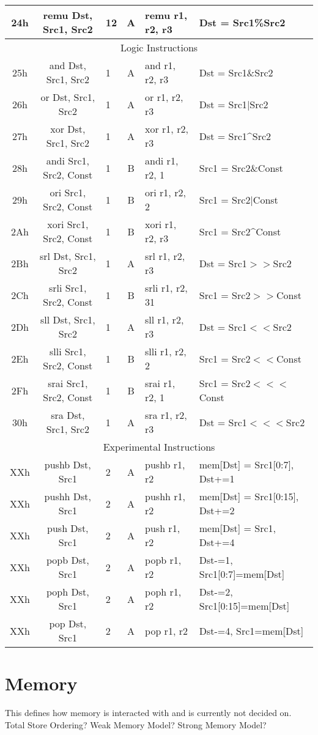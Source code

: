 \documentclass[]{article}
\begin{document}
\begin{longtable}{|c|c|l|c|l|p{5cm}|}
	\hline
	24h & remu Dst, Src1, Src2 & 12 & A & remu r1, r2, r3 & Dst = Src1\%Src2 \\
	\hline
	\multicolumn{6}{|c|}{Logic Instructions} \\
	\hline
	25h & and Dst, Src1, Src2 & 1 & A & and r1, r2, r3 & Dst = Src1\&Src2 \\
	\hline
	26h & or Dst, Src1, Src2 & 1 & A & or r1, r2, r3 & Dst = Src1$|$Src2 \\
	\hline
	27h & xor Dst, Src1, Src2 & 1 & A & xor r1, r2, r3 & Dst = Src1\string^Src2 \\
	\hline
	28h & andi Src1, Src2, Const & 1 & B & andi r1, r2, 1 & Src1 = Src2\&Const \\
	\hline
	29h & ori Src1, Src2, Const & 1 & B & ori r1, r2, 2 & Src1 = Src2$|$Const \\
	\hline
	2Ah & xori Src1, Src2, Const & 1 & B & xori r1, r2, r3 & Src1 = Src2\string^Const \\
	\hline
	2Bh & srl Dst, Src1, Src2 & 1 & A & srl r1, r2, r3 & Dst = Src1$>>$Src2 \\
	\hline
	2Ch & srli Src1, Src2, Const & 1 & B & srli r1, r2, 31 & Src1 = Src2$>>$Const \\
	\hline
	2Dh & sll Dst, Src1, Src2 & 1 & A & sll r1, r2, r3 & Dst = Src1$<<$Src2 \\
	\hline
	2Eh & slli Src1, Src2, Const & 1 & B & slli r1, r2, 2 & Src1 = Src2$<<$Const \\
	\hline
	2Fh & srai Src1, Src2, Const & 1 & B & srai r1, r2, 1 & Src1 = Src2$<<<$Const \\
	\hline
	30h & sra Dst, Src1, Src2 & 1 & A & sra r1, r2, r3 & Dst = Src1$<<<$Src2 \\
	\hline
	\multicolumn{6}{|c|}{Experimental Instructions} \\
	\hline
	XXh & pushb Dst, Src1 & 2 & A & pushb r1, r2 & mem[Dst] = Src1[0:7], Dst+=1 \\
	\hline
	XXh & pushh Dst, Src1 & 2 & A & pushh r1, r2 & mem[Dst] = Src1[0:15], Dst+=2 \\
	\hline
	XXh & push Dst, Src1 & 2 & A & push r1, r2 & mem[Dst] = Src1, Dst+=4 \\
	\hline
	XXh & popb Dst, Src1 & 2 & A & popb r1, r2 & Dst-=1, Src1[0:7]=mem[Dst] \\
	\hline
	XXh & poph Dst, Src1 & 2 & A & poph r1, r2 & Dst-=2, Src1[0:15]=mem[Dst] \\
	\hline
	XXh & pop Dst, Src1 & 2 & A & pop r1, r2 & Dst-=4, Src1=mem[Dst] \\
	\hline
\end{longtable}

\section{Memory}
This defines how memory is interacted with and is currently not decided on.
Total Store Ordering? Weak Memory Model? Strong Memory Model?
\end{document}
